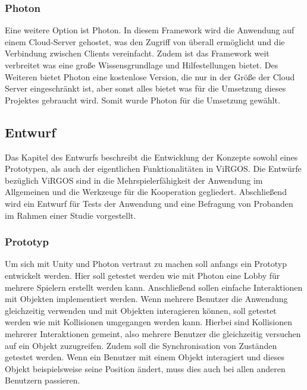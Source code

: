 \subsubsection{Photon}
Eine weitere Option ist Photon. In diesem Framework wird die Anwendung auf einem Cloud-Server gehostet, was den Zugriff von überall ermöglicht und die Verbindung zwischen Clients vereinfacht. Zudem ist das Framework weit verbreitet was eine große Wissensgrundlage und Hilfestellungen bietet. Des Weiteren bietet Photon eine kostenlose Version, die nur in der Größe der Cloud Server eingeschränkt ist, aber sonst alles bietet was für die Umsetzung dieses Projektes gebraucht wird. Somit wurde Photon für die Umsetzung gewählt. 

\subsection{Entwurf}
Das Kapitel des Entwurfs beschreibt die Entwicklung der Konzepte sowohl eines Prototypen, als auch der eigentlichen Funktionalitäten in ViRGOS. Die Entwürfe bezüglich ViRGOS sind in die Mehrspielerfähigkeit der Anwendung im Allgemeinen und die Werkzeuge für die Kooperation gegliedert. Abschließend wird ein Entwurf für Tests der Anwendung und eine Befragung von Probanden im Rahmen einer Studie vorgestellt.

\subsubsection{Prototyp}
Um sich mit Unity und Photon vertraut zu machen soll anfangs ein Prototyp entwickelt werden. Hier soll getestet werden wie mit Photon eine Lobby für mehrere Spielern erstellt werden kann. Anschließend sollen einfache Interaktionen mit Objekten implementiert werden. Wenn mehrere Benutzer die Anwendung gleichzeitig verwenden und mit Objekten interagieren können, soll getestet werden wie mit Kollisionen umgegangen werden kann. Hierbei sind Kollisionen mehrerer Interaktionen gemeint, also mehrere Benutzer die gleichzeitig versuchen auf ein Objekt zuzugreifen. Zudem soll die Synchronisation von Zuständen getestet werden. Wenn ein Benutzer mit einem Objekt interagiert und dieses Objekt beispielsweise seine Position ändert, muss dies auch bei allen anderen Benutzern passieren. 


